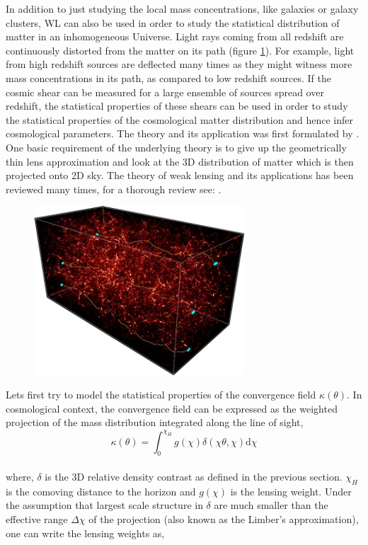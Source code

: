 In addition to just studying the local mass concentrations, like galaxies or galaxy
clusters, WL can also be used in order to study the statistical distribution of matter
in an inhomogeneous Universe. Light rays coming from all redshift are continuously
distorted from the matter on its path (figure \ref{fig:wl}). 
For example, light from high redshift sources
are deflected many times as they might witness more mass concentrations in its path, 
as compared to low redshift sources. If the cosmic shear can be measured for 
a large ensemble of sources spread over redshift, the statistical properties
of these shears can be used in order to study the statistical properties of the
cosmological matter distribution and hence infer cosmological parameters. The 
theory and its application was first formulated by \cite{1991MNRAS.251..600B}.
One basic requirement of the underlying theory is to give up the geometrically
thin lens approximation and look at the 3D distribution of matter which 
is then projected onto 2D sky. The theory of weak lensing and its applications
has been reviewed many times, for a thorough review see: \cite{}.

\begin{figure}
	\centering
	\includegraphics[width=0.7\textwidth]{figures/weaklensing.png}
	\caption{}
	\label{fig:wl}
\end{figure}

Lets first try to model the statistical properties of the convergence field
$\kappa(\theta)$. In cosmological context, the convergence field can be expressed
as the weighted projection of the mass distribution integrated along the line of 
sight,
\begin{equation}
	\kappa(\theta) = \int_0^{\chi_H} g(\chi)\delta(\chi\theta,\chi) \mathrm{d}\chi
\end{equation}
\\
where, $\delta$ is the 3D relative density contrast as defined in the previous section.
$\chi_H$ is the comoving distance to the horizon and $g(\chi)$ is the lensing 
weight. Under the assumption that largest scale structure in $\delta$ are much smaller
than the effective range $\Delta \chi$ of the projection (also known as the Limber's 
approximation), one can write the lensing weights as,

